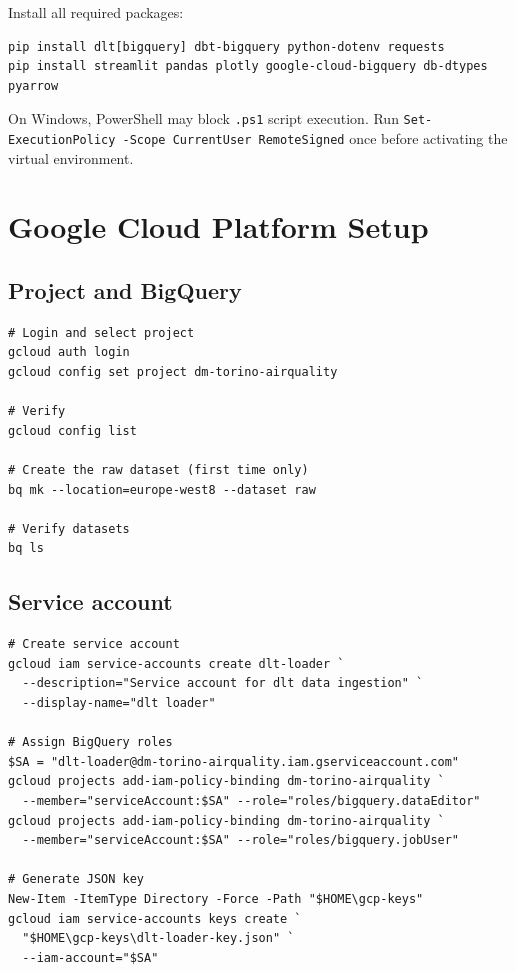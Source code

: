 \documentclass[11pt,a4paper]{article}
\begin{document}
Install all required packages:

\begin{lstlisting}[style=shell]
pip install dlt[bigquery] dbt-bigquery python-dotenv requests
pip install streamlit pandas plotly google-cloud-bigquery db-dtypes pyarrow
\end{lstlisting}

\begin{tcolorbox}[warnbox,title=Note on execution policy]
On Windows, PowerShell may block \texttt{.ps1} script execution.
Run \texttt{Set-ExecutionPolicy -Scope CurrentUser RemoteSigned} once before activating the virtual environment.
\end{tcolorbox}

\section{Google Cloud Platform Setup}

\subsection{Project and BigQuery}

\begin{lstlisting}[style=shell]
# Login and select project
gcloud auth login
gcloud config set project dm-torino-airquality

# Verify
gcloud config list

# Create the raw dataset (first time only)
bq mk --location=europe-west8 --dataset raw

# Verify datasets
bq ls
\end{lstlisting}

\subsection{Service account}

\begin{lstlisting}[style=shell]
# Create service account
gcloud iam service-accounts create dlt-loader `
  --description="Service account for dlt data ingestion" `
  --display-name="dlt loader"

# Assign BigQuery roles
$SA = "dlt-loader@dm-torino-airquality.iam.gserviceaccount.com"
gcloud projects add-iam-policy-binding dm-torino-airquality `
  --member="serviceAccount:$SA" --role="roles/bigquery.dataEditor"
gcloud projects add-iam-policy-binding dm-torino-airquality `
  --member="serviceAccount:$SA" --role="roles/bigquery.jobUser"

# Generate JSON key
New-Item -ItemType Directory -Force -Path "$HOME\gcp-keys"
gcloud iam service-accounts keys create `
  "$HOME\gcp-keys\dlt-loader-key.json" `
  --iam-account="$SA"
\end{lstlisting}
\end{document}
